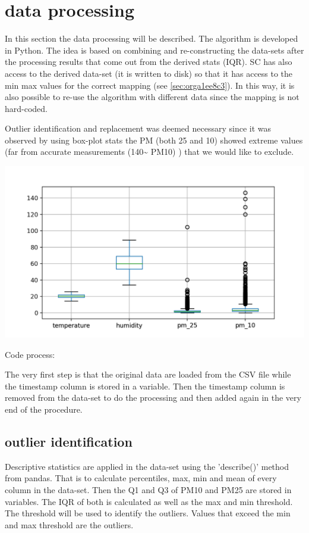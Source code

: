 \documentclass[11pt]{article}
\begin{document}
\section{data processing}
\label{sec:orge19232b}
In this section the data processing will be described.  The algorithm is developed in Python.  The idea is based on combining and re-constructing the data-sets after the processing results that come out from the derived stats (IQR).  SC has also access to the derived data-set (it is written to disk) so that it has access to the min max values for the correct mapping (see \ref{sec:orga1ee8c3}).  In this way, it is also possible to re-use the algorithm with different data since the mapping is not hard-coded.

Outlier identification and replacement was deemed necessary since it was observed by using box-plot stats the PM (both 25 and 10) showed extreme values (far from accurate measurements (140\textasciitilde{} PM10) ) that we would like to exclude.

\begin{center}
\includegraphics[width=.9\linewidth]{./boxplot.png}
\end{center}

Code process:

The very first step is that the original data are loaded from the CSV file while the timestamp column is stored in a variable.  Then the timestamp column is removed from the data-set to do the processing and then added again in the very end of the procedure.

\subsection{outlier identification}
\label{sec:org7e56c65}
Descriptive statistics are applied in the data-set using the 'describe()' method from pandas.  That is to calculate percentiles, max, min and mean of every column in the data-set.  Then the Q1 and Q3 of PM10 and PM25 are stored in variables.  The IQR of both is calculated as well as the max and min threshold.  The threshold will be used to identify the outliers.  Values that exceed the min and max threshold are the outliers.
\end{document}
